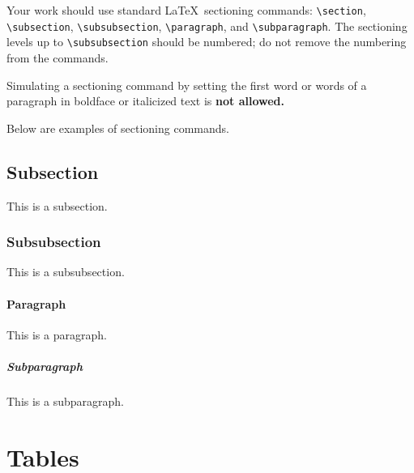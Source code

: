 \documentclass[sigconf]{nimeart}
\begin{document}
Your work should use standard \LaTeX\ sectioning commands:
\allowbreak\verb|\section|, \verb|\subsection|, \verb|\subsubsection|, 
\verb|\paragraph|, and \allowbreak\verb|\subparagraph|. The sectioning levels up to
\verb|\subsubsection| should be numbered; do not remove the numbering
from the commands.


Simulating a sectioning command by setting the first word or words of
a paragraph in boldface or italicized text is {\bfseries not allowed.}

Below are examples of sectioning commands.

\subsection{Subsection}
\label{sec:subsection}

This is a subsection.

\subsubsection{Subsubsection}
\label{sec:subsubsection}

This is a subsubsection.

\paragraph{Paragraph}

This is a paragraph.

\subparagraph{Subparagraph}

This is a subparagraph.

\section{Tables}
\end{document}
